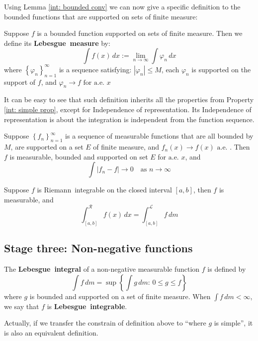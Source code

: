 \documentclass{ctexbook}
\begin{document}
\noindent Using Lemma \ref{int: bounded conv} we can now give a specific definition to the bounded functions that are supported
on sets of finite measure:
\begin{define}
    Suppose $f$ is a bounded function supported on sets of finite measure. Then we define its \textbf{Lebesgue~measure} by:
    \[\int f(x)\, dx := \lim_{n\rightarrow\infty}\int\varphi_n\, dx\]
    where $\left\{\varphi_n\right\}_{n=1}^\infty$ is a sequence satisfying: $\left\lvert \varphi_n\right\rvert \leq M$,
    each $\varphi_n$ is supported on the support of $f$, and $\varphi_n \rightarrow f \text{ for a.e. } x$
\end{define}

It can be easy to see that such definition inherits all the properties from Property \ref{int: simple prop}, except for Independence
of representation. Its Independence of representation is about the integration is independent from the function sequence.

\begin{thm}
    Suppose $\left\{f_n\right\}_{n=1}^\infty$ is a sequence of measurable functions that are all bounded by $M$, are supported on
    a set $E$ of finite measure, and $f_n(x) \rightarrow f(x)\text{ a.e. }$. Then $f$ is measurable, bounded and supported on set
    $E$ for $\text{a.e. }x$, and \[\int\left\lvert f_n - f\right\rvert \rightarrow 0 \quad \text{as }n \rightarrow \infty\]
\end{thm}

\begin{thm}
    Suppose $f$ is Riemann~integrable on the closed interval $[a,b]$, then $f$ is measurable, and
    \[\int_{[a,b]}^\mathcal{R}f(x)\,dx = \int_{[a,b]}^\mathcal{L}f\, dm\]
\end{thm}

\subsection*{Stage three: Non-negative functions}

\begin{define}
    The \textbf{Lebesgue~integral} of a non-negative measurable function $f$ is defined by
    \[\int f \,dm= \sup\left\{\int g\,dm:\, 0\leq g \leq f\right\} \]
    where $g$ is bounded and supported on a set of finite measure. When $\int f\,dm < \infty$, we say that $f$ is \textbf{Lebesgue~integrable}.
\end{define}
Actually, if we transfer the constrain of definition above to ``where $g$ is simple'', it is also an equivalent definition.
\end{document}
